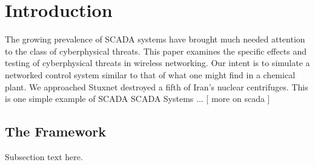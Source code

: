 \section{Introduction}
The growing prevalence of SCADA systems have brought much needed attention to the class of cyberphysical threats.  This paper examines the specific effects and testing of cyberphysical threats in wireless networking.  Our intent is to simulate a networked control system similar to that of what one might find in a chemical plant. We approached
Stuxnet destroyed a fifth of Iran's nuclear centrifuges.  This is one simple example of SCADA 
SCADA Systems ... [ more on scada ]



\subsection{The Framework}
Subsection text here.
